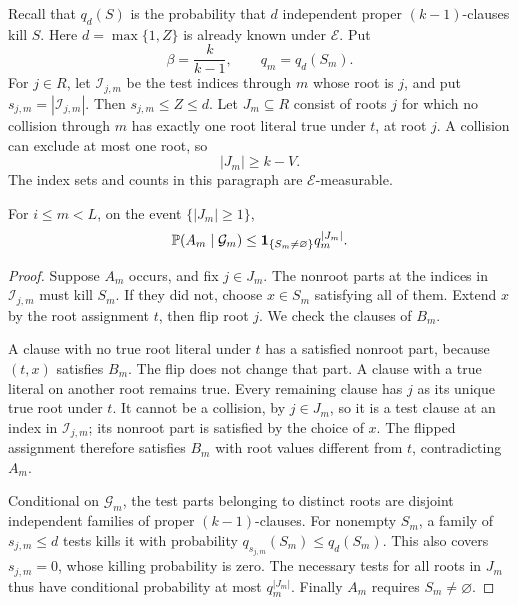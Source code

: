 Recall that \(q_d(S)\) is the probability that \(d\) independent
proper \((k-1)\)-clauses kill \(S\).  Here \(d=\max\{1,Z\}\) is already
known under \(\mathcal E\).  Put
\[
 \beta=\frac{k}{k-1},\qquad q_m=q_d(S_m).
\]
For \(j\in R\), let \(\mathcal I_{j,m}\) be the test indices through
\(m\) whose root is \(j\), and put \(s_{j,m}=|\mathcal I_{j,m}|\).
Then \(s_{j,m}\le Z\le d\).  Let \(J_m\subseteq R\) consist of roots
\(j\) for which no collision through \(m\) has exactly one root literal
true under \(t\), at root \(j\).  A collision can exclude at most one
root, so
\begin{equation}\label{eq:available-root-tests}
 |J_m|\ge k-V.
\end{equation}
The index sets and counts in this paragraph are
\(\mathcal E\)-measurable.

\begin{lemma}\label{lem:root-flip-tests}
For \(i\le m<L\), on the event \(\{|J_m|\ge1\}\),
\begin{equation}\label{eq:root-flip-tests}
 \mathbb P(A_m\mid\mathcal G_m)
 \le \mathbf1_{\{S_m\ne\varnothing\}}q_m^{|J_m|}.
\end{equation}
\end{lemma}

\begin{proof}
Suppose \(A_m\) occurs, and fix \(j\in J_m\).  The nonroot parts
at the indices in \(\mathcal I_{j,m}\) must kill \(S_m\).
If they did not, choose \(x\in S_m\) satisfying all of them.
Extend \(x\) by the root assignment \(t\), then flip root \(j\).
We check the clauses of \(B_m\).

A clause with no true root literal under \(t\) has a satisfied nonroot
part, because \((t,x)\) satisfies \(B_m\).  The flip does not change
that part.  A clause with a true literal on another root remains true.
Every remaining clause has \(j\) as its unique true root under \(t\).
It cannot be a collision, by \(j\in J_m\), so it is a test clause at
an index in \(\mathcal I_{j,m}\); its nonroot part is satisfied by
the choice of \(x\).  The flipped assignment therefore satisfies
\(B_m\) with root values different from \(t\), contradicting \(A_m\).

Conditional on \(\mathcal G_m\), the test parts belonging to distinct
roots are disjoint independent families of proper \((k-1)\)-clauses.
For nonempty \(S_m\), a family of \(s_{j,m}\le d\) tests kills it with
probability \(q_{s_{j,m}}(S_m)\le q_d(S_m)\).  This also covers
\(s_{j,m}=0\), whose killing probability is zero.  The necessary
tests for all roots in \(J_m\) thus have conditional probability at
most \(q_m^{|J_m|}\).  Finally \(A_m\) requires \(S_m\ne\varnothing\).
\end{proof}

